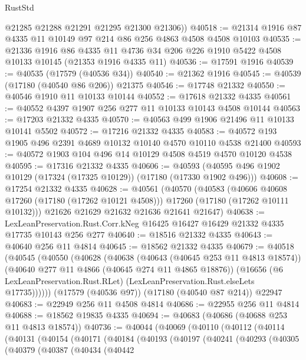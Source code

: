 \begin{lexlean}{RustStd}
\begin{coremodule}
{\begin{coremodule}
{{{{{{{{{{{{{{{{{{{{{{{{{{{{{{{{{{{{{{{{{{{{{{{{{{{{{{{        @21285
        @21288
        @21291
        @21295
        @21300
        @21306))
@40518 := @21314 @1916 @87 @4335 @11 @10149 @97 @214 @86 @256 @4863 @4508 @4508 @10103
@40535 := @21336
    @1916
    @86
    @4335
    @11
    @4736
    @34
    @206
    @226
    @1910
    @5422
    @4508
    @10133
    @10145
    (@21353 @1916 @4335 @11)
@40536 := @17591 @1916
@40539 := @40535 (@17579 (@40536 @34))
@40540 := @21362 @1916
@40545 := @40539 (@17180 (@40540 @86 @206)) @21375
@40546 := @17748 @21332
@40550 := @40546 @1910 @11 @10133 @10144
@40552 := @17618 @21332 @4335
@40561 := @40552 @4397 @1907 @256 @277 @11 @10133 @10143 @4508 @10144
@40563 := @17203 @21332 @4335
@40570 := @40563 @499 @1906 @21496 @11 @10133 @10141 @5502
@40572 := @17216 @21332 @4335
@40583 := @40572 @193 @1905 @496 @2391 @4689 @10132 @10140 @4570 @10110 @4538 @21400
@40593 := @40572 @1903 @104 @496 @14 @10129 @4508 @4519 @4570 @10120 @4538
@40595 := @17316 @21332 @4335
@40606 := @40593 (@40595 @496 @1902 @10129 (@17324 (@17325 @10129)) (@17180 (@17330 @1902 @496)))
@40608 := @17254 @21332 @4335
@40628 := @40561
    (@40570
      (@40583
        (@40606 @40608 @17260 (@17180 (@17262 @10121 @4508)))
        @17260
        (@17180 (@17262 @10111 @10132)))
      @21626
      @21629
      @21632
      @21636
      @21641
      @21647)
@40638 := LexLeanPreservation.Rust.Corr.kNeg
    @16425
    @16427
    @16429
    @21332
    @4335
    @17735
    @10143
    @256
    @277
@40640 := @18516 @21332 @4335
@40643 := @40640 @256 @11 @4814
@40645 := @18562 @21332 @4335
@40679 := @40518
    (@40545
      (@40550
        (@40628
          (@40638
            (@40643 (@40645 @253 @11 @4813 @18574))
            (@40640 @277 @11 @4866 (@40645 @274 @11 @4865 @18876))
            (@16656
              (@6 LexLeanPreservation.Rust.RLet)
              (LexLeanPreservation.Rust.elseLets @17735))))))
    (@17579 (@40536 @97))
    (@17180 (@40540 @87 @214))
    @22947
@40683 := @22949 @256 @11 @4508 @4814
@40686 := @22955 @256 @11 @4814
@40688 := @18562 @19835 @4335
@40694 := @40683 (@40686 (@40688 @253 @11 @4813 @18574))
@40736 := @40044
    (@40069
      (@40110
        (@40112
          (@40114
            (@40131
              (@40154
                (@40171
                  (@40184
                    (@40193
                      (@40197
                        (@40241
                          (@40293
                            (@40305
                              (@40379
                                (@40387
                                  (@40434
                                    (@40442
}}}}}}}}}}}}}}}}}}}}}}}}}}}}}}}}}}}}}}}}}}}}}}}}}}}}}}}
\end{coremodule}}
\end{coremodule}
\end{lexlean}

